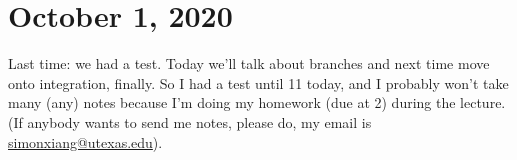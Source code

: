 \section{October 1, 2020}
Last time: we had a test. Today we'll talk about branches and next time move onto integration, finally. So I had a test until 11 today, and I probably won't take many (any) notes because I'm doing my homework (due at 2) during the lecture. (If anybody wants to send me notes, please do, my email is \url{simonxiang@utexas.edu}).
